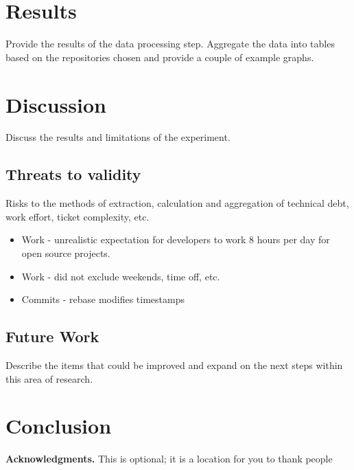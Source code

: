 \documentclass{mpaper}
\begin{document}
\section{Results}
\label{results}

Provide the results of the data processing step. Aggregate the data into tables
based on the repositories chosen and provide a couple of example graphs. 

\section{Discussion}
\label{discussion}

Discuss the results and limitations of the experiment.

\subsection{Threats to validity}
\label{validity}

Risks to the methods of extraction, calculation and aggregation of technical
debt, work effort, ticket complexity, etc.

\begin{itemize}
  \item Work - unrealistic expectation for developers to work 8 hours per day
  for open source projects.
  \item Work - did not exclude weekends, time off, etc.
  \item Commits - rebase modifies timestamps
\end{itemize}

\subsection{Future Work}
\label{future-work}

Describe the items that could be improved and expand on the next steps within
this area of research.

\section{Conclusion}
\label{conclusion}

{\bf Acknowledgments.} This is optional; it is a location for you to thank
people



\end{document}

